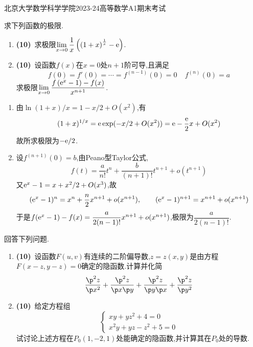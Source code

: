 \documentclass{ctexart}
\begin{document}
\pagestyle{empty}
\begin{center}\Large
北京大学数学科学学院2023-24高等数学A1期末考试
\end{center}
\begin{problem}[1.(20\songti{分})]
求下列函数的极限.
        \begin{enumerate}[label=\tbf{(\arabic*)}]
            \item \textbf{(10)}\ 求极限$\displaystyle\lim_{x\to0}\dfrac1x\left(\left(1+x\right)^{\frac1x}-\mathrm{e}\right)$.
            \item \textbf{(10)}\ 设函数$f(x)$在$x=0$处$n+1$阶可导,且满足\[f(0)=f'(0)=\cdots=f^{(n-1)}(0)=0\ \ \ \ \ f^{(n)}(0)=a\]求极限$\displaystyle\lim_{x\to0}\dfrac{f\left(\mathrm{e}^x-1\right)-f(x)}{x^{n+1}}$.
        \end{enumerate}
\end{problem}
\begin{solution}
\begin{enumerate}[label=\tbf{(\arabic*)},leftmargin=*]
\item 由$\ln(1+x)/x=1-x/2+O(x^2)$,有
\[(1+x)^{1/x}=\mathrm{e}\exp(-x/2+O(x^2))=\mathrm{e}-\dfrac{\mathrm{e}}2x+O(x^2)\]
故所求极限为$-\mathrm{e}/2$.
\item 设$f^{(n+1)}(0)=b$,由Peano型Taylor公式,
\[f(t)=\dfrac{a}{n!}t^n+\dfrac{b}{(n+1)!}t^{n+1}+o(t^{n+1})\]
又$\mathrm{e}^x-1=x+x^2/2+O(x^3)$,故
\[(\mathrm{e}^x-1)^n=x^n+\dfrac n2x^{n+1}+o(x^{n+1}),\qquad
(\mathrm{e}^x-1)^{n+1}=x^{n+1}+o(x^{n+1})\]
于是$f(\mathrm{e}^x-1)-f(x)=\dfrac{a}{2(n-1)!}x^{n+1}+o(x^{n+1})$,极限为$\dfrac{a}{2(n-1)!}$.
\end{enumerate}
\end{solution}
\begin{problem}[2.(20\songti{分})]
回答下列问题.
        \begin{enumerate}[label=\tbf{(\arabic*)}]
            \item \textbf{(10)}\ 设函数$F(u,v)$有连续的二阶偏导数,$z=z(x,y)$是由方程$F(x-z,y-z)=0$确定的隐函数.计算并化简
                \[\dfrac{\p^2z}{\p x^2}+\dfrac{\p^2z}{\p x\p y}+\dfrac{\p^2z}{\p y\p x}+\dfrac{\p^2z}{\p y^2}\]
            \item \textbf{(10)}\ 给定方程组
                \[\left\{\begin{array}{l}
                    xy+yz^2+4=0\\
                    x^2y+yz-z^2+5=0
                \end{array}\right.\]
                试讨论上述方程在$P_0\left(1,-2,1\right)$处能确定的隐函数,并计算其在$P_0$处的导数.
        \end{enumerate}
\end{problem}
\end{document}
